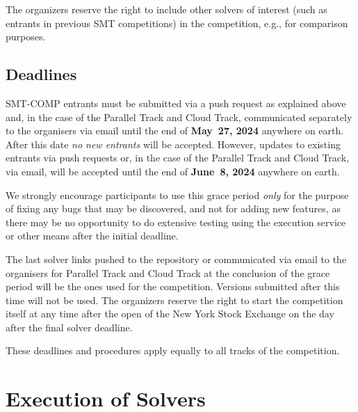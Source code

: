 \documentclass[12pt]{article}
\newcommand{\paralleltrack}{Parallel Track\xspace}
\newcommand{\cloudtrack}{Cloud Track\xspace}
\newcommand{\executionservice}{execution service\xspace}
\begin{document}
%
The organizers reserve the right to include other solvers of interest
(such as entrants in previous SMT competitions) in the competition,
e.g., for comparison purposes.

%


\subsection*{Deadlines}

SMT-COMP entrants must be submitted via a push request as explained above and,
in the case of the \paralleltrack{} and \cloudtrack{},
communicated separately to the organisers via email until the end of
{\bf May~27, 2024} anywhere on earth.
After this date \emph{no new entrants} will be accepted.
However, updates to existing entrants via push requests or,
in the case of the \paralleltrack{} and \cloudtrack{}, via email,
will be accepted until the end of {\bf June~8, 2024} anywhere on earth.

We strongly encourage participants to use this grace period
\emph{only} for the purpose of fixing any bugs that may be discovered,
and not for adding new features, as there may be no opportunity to do
extensive testing using the \executionservice or other means after the initial deadline.

The last solver links pushed to the repository or communicated
via email to the organisers for \paralleltrack{} and \cloudtrack{} at the conclusion of
the grace period will be the ones used for the competition.  Versions
submitted after this time will not be used.  The organizers reserve
the right to start the competition itself at any time after the open
of the New York Stock Exchange on the day after the final solver
deadline.

These deadlines and procedures apply equally to all tracks of the
competition.




\section{Execution of Solvers}
\end{document}
